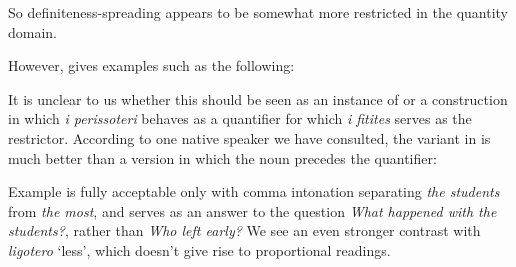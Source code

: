 \documentclass[output=paper
,modfonts
,nonflat]{langsci/langscibook}
\begin{document}
\ea \label{ex:coppockstrand:22}
\begin{xlist}
\end{xlist}
\z

So definiteness-spreading appears to be somewhat more restricted in the quantity domain.

However, \citet{Giannakidou2004} gives examples such as the following:

\z

It is unclear to us whether this should be seen as an instance of  or a construction in which \textit{i perissoteri} behaves as a quantifier for which \textit{i fitites} serves as the restrictor. According to one native  speaker we have consulted, the variant in  is much better than a version in which the noun precedes the quantifier:

\z

Example  is fully acceptable only with comma intonation separating \textit{the students} from \textit{the most}, and serves as an answer to the question \textit{What happened with the students?}, rather than \textit{Who left early?} We see an even stronger contrast with \textit{ligotero} `less', which doesn't give rise to proportional readings. 
\end{document}
